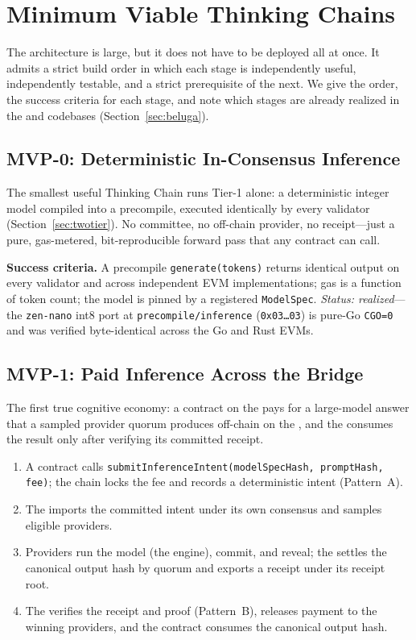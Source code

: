 \section{Minimum Viable Thinking Chains}
\label{sec:mvps}

The architecture is large, but it does not have to be deployed all at once. It admits a strict build order in which each stage is independently useful, independently testable, and a strict prerequisite of the next. We give the order, the success criteria for each stage, and note which stages are already realized in the \Lux{} and \Hanzo{} codebases (Section~\ref{sec:beluga}).

\subsection{MVP-0: Deterministic In-Consensus Inference}

The smallest useful Thinking Chain runs Tier-1 alone: a deterministic integer model compiled into a precompile, executed identically by every validator (Section~\ref{sec:twotier}). No committee, no off-chain provider, no receipt---just a pure, gas-metered, bit-reproducible forward pass that any contract can call.

\textbf{Success criteria.} A precompile \texttt{generate(tokens)} returns identical output on every validator and across independent EVM implementations; gas is a function of token count; the model is pinned by a registered \texttt{ModelSpec}. \emph{Status: realized}---the \texttt{zen-nano} int8 port at \texttt{precompile/inference} (\texttt{0x03\dots03}) is pure-Go \texttt{CGO=0} and was verified byte-identical across the Go and Rust EVMs.

\subsection{MVP-1: Paid Inference Across the Bridge}

The first true cognitive economy: a contract on the \CChain{} pays for a large-model answer that a sampled provider quorum produces off-chain on the \AChain{}, and the \CChain{} consumes the result only after verifying its committed receipt.

\begin{enumerate}[leftmargin=2em,itemsep=2pt]
  \item A \CChain{} contract calls \texttt{submitInferenceIntent(modelSpecHash, promptHash, fee)}; the chain locks the fee and records a deterministic intent (Pattern~A).
  \item The \AChain{} imports the committed intent under its own consensus and samples eligible providers.
  \item Providers run the model (the \Hanzo{} engine), commit, and reveal; the \AChain{} settles the canonical output hash by quorum and exports a receipt under its receipt root.
  \item The \CChain{} verifies the receipt and proof (Pattern~B), releases payment to the winning providers, and the contract consumes the canonical output hash.
\end{enumerate}


